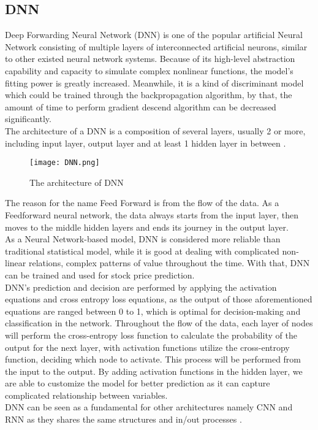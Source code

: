 \documentclass{ieeeojies}
\begin{document}
{\begin{flushleft}
\end{flushleft}
\subsection{DNN}
\begin{flushleft}
    

\hspace{0.4cm}Deep Forwarding Neural Network (DNN) is one of the popular artificial Neural Network consisting of multiple layers of interconnected artificial neurons, similar to other existed neural network systems. Because of its high-level abstraction capability and capacity to simulate complex nonlinear functions, the model's fitting power is greatly increased. Meanwhile, it is a kind of discriminant model which could be trained through the backpropagation algorithm, by that, the amount of time to perform gradient descend algorithm can be decreased significantly.\\
\hspace{0.4cm}The architecture of a DNN is a composition of several layers, usually 2 or more, including input layer, output layer and at least 1 hidden layer in between \cite{dnn1}.\\
\begin{figure}[H]
    \centering
    \texttt{[image: DNN.png]}
    \caption{\centering The architecture of DNN}
    \label{fig:enter-label}
\end{figure}

\hspace{0.4cm}The reason for the name Feed Forward is from the flow of the data. As a Feedforward neural network, the data always starts from the input layer, then moves to the middle hidden layers and ends its journey in the output layer.\\
\hspace{0.4cm}As a Neural Network-based model, DNN is considered more reliable than traditional statistical model, while it is good at dealing with complicated non-linear relations, complex patterns of value throughout the time. With that, DNN can be trained and used for stock price prediction.\\
\hspace{0.4cm}DNN’s prediction and decision are performed by applying the activation equations and cross entropy loss equations, as the output of those aforementioned equations are ranged between 0 to 1, which is optimal for decision-making and classification in the network. Throughout the flow of the data, each layer of nodes will perform the cross-entropy loss function to calculate the probability of the output for the next layer, with activation functions utilize the cross-entropy function, deciding which node to activate. This process will be performed from the input to the output. By adding activation functions in the hidden layer, we are able to customize the model for better prediction as it can capture complicated relationship between variables. \\
\hspace{0.4cm}DNN can be seen as a fundamental for other architectures namely CNN and RNN as they shares the same structures and in/out processes \cite{dnn2}.


\end{flushleft}}
\end{document}
